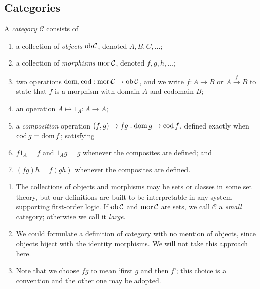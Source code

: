\subsection{Categories}
\begin{definition}
    A \emph{category} \( \mathcal C \) consists of
    \begin{enumerate}
        \item a collection of \emph{objects} \( \operatorname{ob} \mathcal C \), denoted \( A, B, C, \dots \);
        \item a collection of \emph{morphisms} \( \operatorname{mor} \mathcal C \), denoted \( f, g, h, \dots \);
        \item two operations \( \operatorname{dom}, \operatorname{cod} : \operatorname{mor} \mathcal C \to \operatorname{ob} \mathcal C \), and we write \( f : A \to B \) or \( A \xrightarrow f B \) to state that \( f \) is a morphism with domain \( A \) and codomain \( B \);
        \item an operation \( A \mapsto 1_A : A \to A \);
        \item a \emph{composition} operation \( (f, g) \mapsto fg : \operatorname{dom} g \to \operatorname{cod} f \), defined exactly when \( \operatorname{cod} g = \operatorname{dom} f \); satisfying
        \item \( f 1_A = f \) and \( 1_A g = g \) whenever the composites are defined; and
        \item \( (fg)h = f(gh) \) whenever the composites are defined.
    \end{enumerate}
\end{definition}
\begin{remark}
    \begin{enumerate}
        \item The collections of objects and morphisms may be sets or classes in some set theory, but our definitions are built to be interpretable in any system supporting first-order logic.
        If \( \operatorname{ob} \mathcal C \) and \( \operatorname{mor} \mathcal C \) are sets, we call \( \mathcal C \) a \emph{small} category; otherwise we call it \emph{large}.
        \item We could formulate a definition of category with no mention of objects, since objects biject with the identity morphisms.
        We will not take this approach here.
        \item Note that we choose \( fg \) to mean `first \( g \) and then \( f \)'; this choice is a convention and the other one may be adopted.
    \end{enumerate} 
\end{remark}
